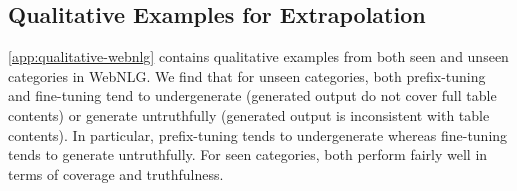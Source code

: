 \documentclass[11pt,a4paper]{article}
\begin{document}

\subsection{Qualitative Examples for Extrapolation}
\cref{app:qualitative-webnlg} contains qualitative examples from both seen and unseen categories in WebNLG. We find that for unseen categories, both prefix-tuning and fine-tuning tend to undergenerate (generated output do not cover full table contents) or generate untruthfully  (generated output is inconsistent with table contents). 
In particular, prefix-tuning tends to undergenerate whereas fine-tuning tends to generate untruthfully. 
For seen categories, both perform fairly well in terms of coverage and truthfulness. 
\end{document}
